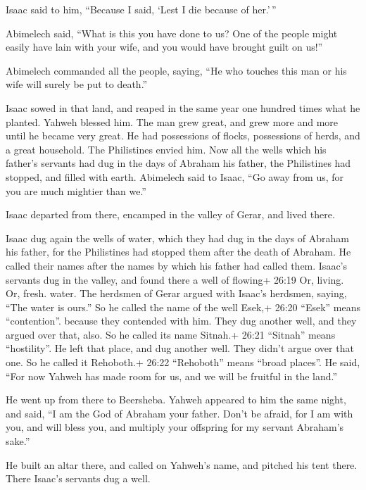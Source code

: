 Isaac said to him, ``Because I said, `Lest I die because of her.'\,''

 Abimelech said, ``What is this you have done to us? One of
the people might easily have lain with your wife, and you would have
brought guilt on us!''

 Abimelech commanded all the people, saying, ``He who
touches this man or his wife will surely be put to death.''

 Isaac sowed in that land, and reaped in the same year one
hundred times what he planted. Yahweh blessed him.  The man
grew great, and grew more and more until he became very great.
 He had possessions of flocks, possessions of herds, and a
great household. The Philistines envied him.  Now all the
wells which his father's servants had dug in the days of Abraham his
father, the Philistines had stopped, and filled with earth.
 Abimelech said to Isaac, ``Go away from us, for you are
much mightier than we.''

 Isaac departed from there, encamped in the valley of
Gerar, and lived there.

 Isaac dug again the wells of water, which they had dug in
the days of Abraham his father, for the Philistines had stopped them
after the death of Abraham. He called their names after the names by
which his father had called them.  Isaac's servants dug in
the valley, and found there a well of flowing+ 26:19 Or, living. Or,
fresh. water.  The herdsmen of Gerar argued with Isaac's
herdsmen, saying, ``The water is ours.'' So he called the name of the
well Esek,+ 26:20 ``Esek'' means ``contention''. because they contended
with him.  They dug another well, and they argued over
that, also. So he called its name Sitnah.+ 26:21 ``Sitnah'' means
``hostility''.  He left that place, and dug another well.
They didn't argue over that one. So he called it Rehoboth.+ 26:22
``Rehoboth'' means ``broad places''. He said, ``For now Yahweh has made
room for us, and we will be fruitful in the land.''

 He went up from there to Beersheba.  Yahweh
appeared to him the same night, and said, ``I am the God of Abraham your
father. Don't be afraid, for I am with you, and will bless you, and
multiply your offspring for my servant Abraham's sake.''

 He built an altar there, and called on Yahweh's name, and
pitched his tent there. There Isaac's servants dug a well.

